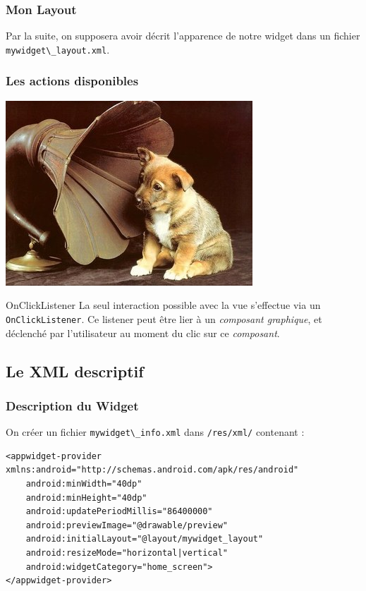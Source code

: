 \documentclass{beamer}
\begin{document}
\begin{frame}
\frametitle{Mon Layout}
Par la suite, on supposera avoir décrit l'apparence de notre widget dans un fichier \verb!mywidget\_layout.xml!.
\end{frame}


\begin{frame}
\frametitle{Les actions disponibles}
\begin{center}
\includegraphics[scale=0.35]{listener.jpg}
\end{center}
\begin{block}{OnClickListener}
La seul interaction possible avec la vue s'effectue via un \verb!OnClickListener!. Ce listener peut être lier à un \emph{composant graphique}, et déclenché par l'utilisateur au moment du clic sur ce \emph{composant}.
\end{block}
\end{frame}

\subsection{Le XML descriptif}

\begin{frame}[fragile]
\frametitle{Description du Widget}

\begin{exampleblock}{On créer un fichier \verb!mywidget\_info.xml! dans \verb!/res/xml/! contenant : }
\lstset{language=xml}
\begin{lstlisting}
<appwidget-provider xmlns:android="http://schemas.android.com/apk/res/android"
    android:minWidth="40dp"
    android:minHeight="40dp"
    android:updatePeriodMillis="86400000"
    android:previewImage="@drawable/preview"
    android:initialLayout="@layout/mywidget_layout"
    android:resizeMode="horizontal|vertical"
    android:widgetCategory="home_screen">
</appwidget-provider>
\end{lstlisting}
\end{exampleblock}
\end{frame}
\end{document}
